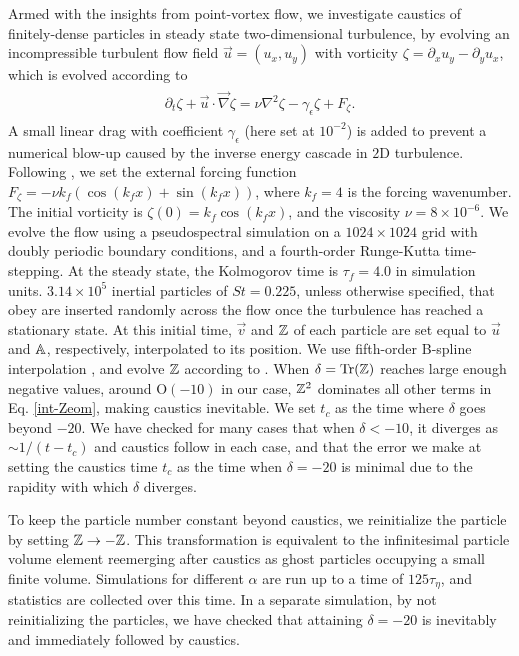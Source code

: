 \documentclass[../Rajarshi-thesis-draft.tex]{subfiles}
\begin{document}
Armed with the insights from point-vortex flow, we investigate caustics of finitely-dense particles in steady state two-dimensional turbulence, by evolving an incompressible turbulent flow field $\vec{u} = (u_x,u_y)$ with vorticity $\zeta=\partial_x u_y - \partial_y u_x$, which is evolved according to
\begin{align}
  \label{int-2DNS}
  \begin{split}
      \partial_t\zeta + \vec{u}\cdot\vec{\nabla} \zeta = \nu\nabla^2\zeta - \gamma_\epsilon \zeta  +  F_\zeta.
  \end{split}
\end{align}
A small linear drag with coefficient $\gamma_\epsilon$ (here set at $10^{-2}$) is added to prevent a numerical blow-up caused by the inverse energy cascade in $2$D turbulence. Following \cite{pandey2019}, we set the external forcing function $F_\zeta = -\nu k_f(\cos(k_f x) + \sin(k_f x))$, where $k_f = 4$ is the forcing wavenumber. The initial vorticity is $\zeta(0) = k_f\cos(k_f x)$, and the viscosity $\nu = 8 \times 10^{-6}$. We evolve the flow using a pseudospectral simulation on a $1024\times 1024$ grid with doubly periodic boundary conditions, and a fourth-order Runge-Kutta time-stepping. At the steady state, the Kolmogorov time is $\tau_f = 4.0$ in simulation units. $3.14 \times 10^{5}$ inertial particles of $St=0.225$, unless otherwise specified, that obey  are inserted randomly across the flow once the turbulence has reached a stationary state. At this initial time, $\vec v$ and $\mathbb{Z}$ of each particle are set equal to $\vec u$ and $\mathbb{A}$, respectively, interpolated to its position. We use fifth-order B-spline interpolation \cite{vanhinsberg2012}, and evolve $\mathbb{Z}$ according to . {When $\delta = \operatorname{Tr}(\mathbb{Z})$ reaches large enough negative values, around $\text{O}(-10)$ in our case, $\mathbb{Z}^2$ dominates all other terms in Eq. \eqref{int-Zeom}, making caustics inevitable. We set $t_c$ as the time where $\delta$ goes beyond $-20$. We have checked for many cases that when $\delta<-10$, it diverges as $\sim 1/(t-t_c)$ and caustics follow in each case, and that the error we make at setting the caustics time $t_c$ as the time when $\delta = -20$ is minimal due to the rapidity with which $\delta$ diverges. }

To keep the particle number constant beyond caustics, we reinitialize the particle by setting $\mathbb{Z} \to -\mathbb{Z}$. This transformation is equivalent to the infinitesimal particle volume element reemerging after caustics as ghost particles \cite{falkovich2007} occupying a small finite volume. Simulations for different $\alpha$ are run up to a time of $125\tau_\eta$, and statistics are collected over this time. {In a separate simulation, by not reinitializing the particles, we have checked that attaining $\delta = -20$ is inevitably and immediately followed by caustics. }
\end{document}
